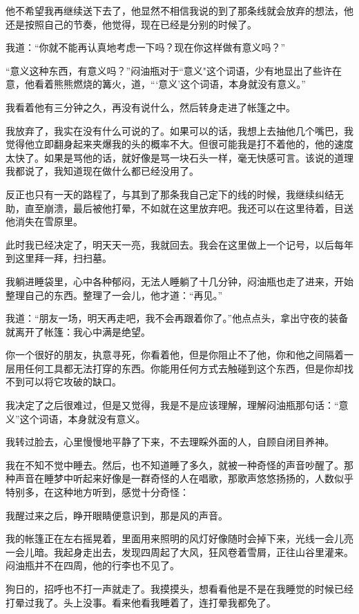 他不希望我再继续送下去了，他显然不相信我说的到了那条线就会放弃的想法，他还是按照自己的节奏，他觉得，现在已经是分别的时候了。

我道：“你就不能再认真地考虑一下吗？现在你这样做有意义吗？”

“意义这种东西，有意义吗？”闷油瓶对于“意义"这个词语，少有地显出了些许在意，他看着熊熊燃烧的篝火，道，“‘意义’这个词语，本身就没有意义。”

我看着他有三分钟之久，再没有说什么，然后转身走进了帐篷之中。

我放弃了，我实在没有什么可说的了。如果可以的话，我想上去抽他几个嘴巴，我觉得他立即翻身起来夹爆我的头的概率不大。但很可能我是打不着他的，他的速度太快了。如果是骂他的话，就好像是骂一块石头一样，毫无快感可言。该说的道理我都说了，我知道现在做什么都已经没用了。

反正也只有一天的路程了，与其到了那条我自己定下的线的时候，我继续纠结无助，直至崩溃，最后被他打晕，不如就在这里放弃吧。我还可以在这里待着，目送他消失在雪原里。

此时我已经决定了，明天天一亮，我就回去。我会在这里做上一个记号，以后每年到这里拜一拜，扫扫墓。

我躺进睡袋里，心中各种郁闷，无法人睡躺了十几分钟，闷油瓶也走了进来，开始整理自己的东西。整理了一会儿，他才道：“再见。”

我道：“朋友一场，明天再走吧，我不会再跟着你了。”他点点头，拿出守夜的装备就离开了帐篷：我心中满是绝望。

你一个很好的朋友，执意寻死，你看着他，但是你阻止不了他，你和他之间隔着一层用任何工具都无法打穿的东西。你能用任何方式去触碰到这个东西，但是你却找不到可以将它攻破的缺口。

我决定了之后很难过，但是又觉得，我是不是应该理解，理解闷油瓶那句话：“意义”这个词语，本身就没有意义。

我转过脸去，心里慢慢地平静了下来，不去理睬外面的人，自顾自闭目养神。

我在不知不觉中睡去。然后，也不知道睡了多久，就被一种奇怪的声音吵醒了。那种声音在睡梦中听起来好像是一群奇怪的人在唱歌，那歌声悠悠扬扬的，人数似乎特别多，在这种地方听到，感觉十分奇怪：

我醒过来之后，睁开眼睛便意识到，那是风的声音。

我的帐篷正在左右摇晃着，里面用来照明的风灯好像随时会掉下来，光线一会儿亮一会儿暗。我起身走出去，发现四周起了大风，狂风卷着雪屑，正往山谷里灌来。闷油瓶并不在四周，他的行李也不见了。

狗日的，招呼也不打一声就走了。我摸摸头，想看看他是不是在我睡觉的时候已经打晕过我了。头上没事。看来他看我睡着了，连打晕我都免了。

